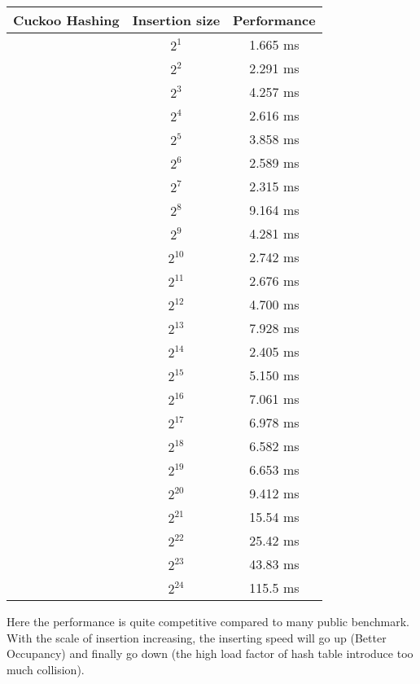 \documentclass[twoside,11pt]{article}
\begin{document}
    \begin{tabular}{|c|c|c|}
        \hline  
      Cuckoo Hashing  & Insertion size  &  Performance \\
        \hline   
        & $ 2^{1}  $ &  1.665 ms\\
        & $ 2^{2}  $ &  2.291 ms\\
        & $ 2^{3}  $ &  4.257 ms\\
        & $ 2^{4}  $ &  2.616 ms\\
        & $ 2^{5}  $ &  3.858 ms\\
        & $ 2^{6}  $ &  2.589 ms\\
        & $ 2^{7}  $ &  2.315 ms\\
        & $ 2^{8}  $ &  9.164 ms\\
        & $ 2^{9}  $ &  4.281 ms\\
        & $ 2^{10}  $ & 2.742 ms \\
        & $ 2^{11}  $ & 2.676 ms\\
        & $ 2^{12}  $ & 4.700 ms\\
        & $ 2^{13}  $ & 7.928 ms\\
        & $ 2^{14}  $ & 2.405 ms\\
        & $ 2^{15}  $ & 5.150 ms\\
        & $ 2^{16}  $ & 7.061 ms\\
        & $ 2^{17}  $ & 6.978 ms\\
        & $ 2^{18}  $ & 6.582 ms\\
        & $ 2^{19}  $ & 6.653 ms\\
        & $ 2^{20}  $ & 9.412 ms\\
        & $ 2^{21}  $ & 15.54 ms\\
        & $ 2^{22}  $ & 25.42 ms\\
        & $ 2^{23}  $ & 43.83 ms\\
        & $ 2^{24}  $ & 115.5 ms\\
        \hline  

    \end{tabular}
    
    Here the performance is quite competitive compared to many public benchmark. With the scale of insertion increasing, the inserting speed will go up (Better Occupancy) and finally go down (the high load factor of hash table introduce too much collision).
\end{document}
